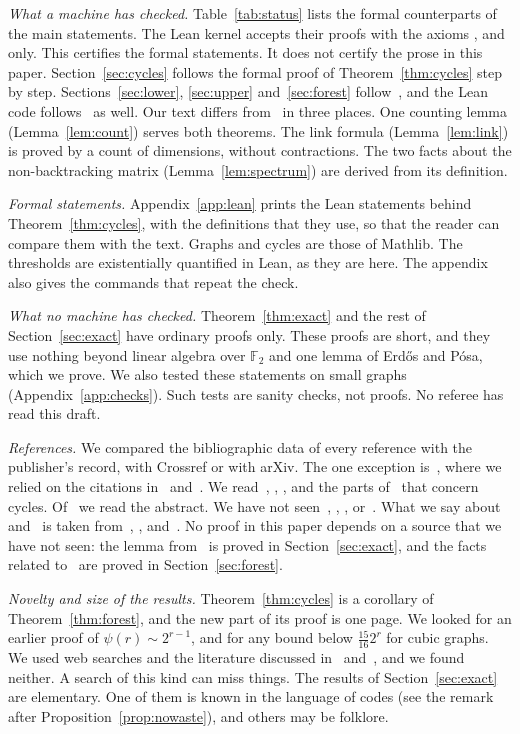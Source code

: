 \documentclass[11pt]{article}
\theoremstyle{definition}
\theoremstyle{remark}
\begin{document}
\emph{What a machine has checked.} Table~\ref{tab:status} lists the formal counterparts of the main
statements. The Lean kernel accepts their proofs with the axioms ,
 and  only. This certifies the formal statements. It does
not certify the prose in this paper. Section~\ref{sec:cycles} follows the formal proof of
Theorem~\ref{thm:cycles} step by step. Sections~\ref{sec:lower}, \ref{sec:upper}
and~\ref{sec:forest} follow~\cite{KNT}, and the Lean code follows~\cite{KNT} as well. Our text
differs from~\cite{KNT} in three places. One counting lemma (Lemma~\ref{lem:count}) serves both
theorems. The link formula (Lemma~\ref{lem:link}) is proved by a count of dimensions, without
contractions. The two facts about the non-backtracking matrix (Lemma~\ref{lem:spectrum}) are derived
from its definition.

\emph{Formal statements.} Appendix~\ref{app:lean} prints the Lean statements behind
Theorem~\ref{thm:cycles}, with the definitions that they use, so that the reader can compare them
with the text. Graphs and cycles are those of Mathlib. The thresholds are existentially quantified
in Lean, as they are here. The appendix also gives the commands that repeat the check.

\emph{What no machine has checked.} Theorem~\ref{thm:exact} and the rest of
Section~\ref{sec:exact} have ordinary proofs only. These proofs are short, and they use nothing
beyond linear algebra over $\mathbb{F}_2$ and one lemma of Erd\H{o}s and P\'osa, which we prove. We
also tested these statements on small graphs (Appendix~\ref{app:checks}). Such tests are sanity
checks, not proofs. No referee has read this draft.

\emph{References.} We compared the bibliographic data of every reference with the publisher's
record, with Crossref or with arXiv. The one exception is~\cite{ES}, where we relied on the
citations in~\cite{AACST} and~\cite{HK}. We read~\cite{AACST}, \cite{Griffin}, \cite{KNT}, and the parts of~\cite{HK} that
concern cycles. Of~\cite{AT} we read the abstract. We have not seen~\cite{Bass}, \cite{Bondy},
\cite{ES}, \cite{EP} or~\cite{KS}. What we say about~\cite{Bondy} and~\cite{ES} is taken
from~\cite{AACST}, \cite{Bloom}, \cite{HK} and~\cite{KNT}. No proof in this paper depends on a
source that we have not seen: the lemma from~\cite{EP} is proved in Section~\ref{sec:exact}, and
the facts related to~\cite{Bass,KS} are proved in Section~\ref{sec:forest}.

\emph{Novelty and size of the results.} Theorem~\ref{thm:cycles} is a corollary of
Theorem~\ref{thm:forest}, and the new part of its proof is one page. We looked for an earlier proof
of $\psi(r)\sim2^{r-1}$, and for any bound below $\frac{15}{16}2^{r}$ for cubic graphs. We used web
searches and the literature discussed in~\cite{AACST} and~\cite{HK}, and we found neither. A search
of this kind can miss things. The results of Section~\ref{sec:exact} are elementary. One of them is
known in the language of codes (see the remark after Proposition~\ref{prop:nowaste}), and others
may be folklore.
\end{document}
